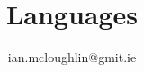 \documentclass[dvipsnames,hidelinks,t]{beamer}
\begin{document}
    \title{Languages}
    \subtitle{}
    \author{ian.mcloughlin@gmit.ie}
    \date{}
  
    \begin{frame}
      \titlepage
    \end{frame}
  
     
  
\end{document}
